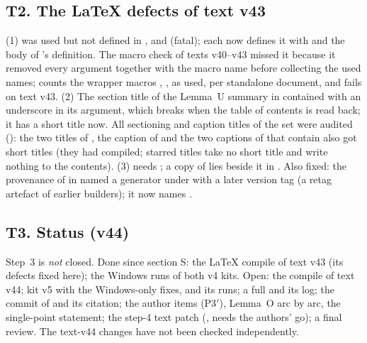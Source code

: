 \subsection*{T2. The LaTeX defects of text v43}
(1)  was used but not defined in ,  and  (fatal); each now defines it with  and the body of 's definition. The macro check of texts v40--v43 missed it because it removed every  argument together with the macro name before collecting the used names;  counts the wrapper macros , ,  as used, per standalone document, and fails on text v43. (2) The section title of the Lemma~U summary in  contained  with an underscore in its argument, which breaks when the table of contents is read back; it has a short title now. All sectioning and caption titles of the set were audited (): the two titles of , the caption of  and the two captions of  that contain  also got short titles (they had compiled; starred titles take no short title and write nothing to the contents). (3)  needs ; a copy of  lies beside it in . Also fixed: the provenance of  in  named a generator under  with a later version tag (a retag artefact of earlier builders); it now names .
\subsection*{T3. Status (v44)}
Step~3 is \emph{not} closed. Done since section S: the LaTeX compile of text v43 (its defects fixed here); the Windows runs of both v4 kits. Open: the compile of text v44; kit v5 with the Windows-only fixes, and its runs; a full  and its log; the commit of  and its citation; the author items (P3$'$), Lemma~O arc by arc, the single-point statement; the step-4 text patch (, needs the authors' go); a final review. The text-v44 changes have not been checked independently.
